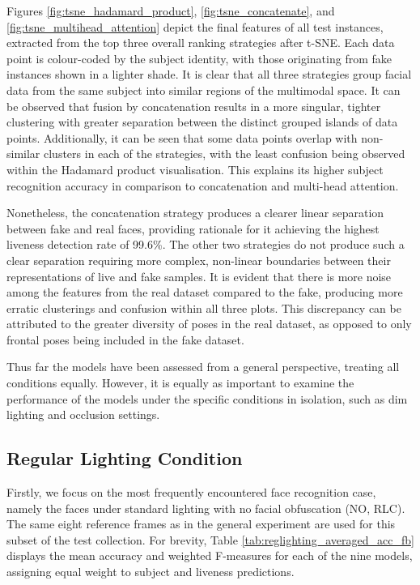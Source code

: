 \documentclass{mpaper}
\begin{document}
Figures \ref{fig:tsne_hadamard_product}, \ref{fig:tsne_concatenate}, and \ref{fig:tsne_multihead_attention} depict the final features of all test instances, extracted from the top three overall ranking strategies after t-SNE. Each data point is colour-coded by the subject identity, with those originating from fake instances shown in a lighter shade. It is clear that all three strategies group facial data from the same subject into similar regions of the multimodal space. It can be observed that fusion by concatenation results in a more singular, tighter clustering with greater separation between the distinct grouped islands of data points. Additionally, it can be seen that some data points overlap with non-similar clusters in each of the strategies, with the least confusion being observed within the Hadamard product visualisation. This explains its higher subject recognition accuracy in comparison to concatenation and multi-head attention. 

Nonetheless, the concatenation strategy produces a clearer linear separation between fake and real faces, providing rationale for it achieving the highest liveness detection rate of 99.6\%. The other two strategies do not produce such a clear separation requiring more complex, non-linear boundaries between their representations of live and fake samples. It is evident that there is more noise among the features from the real dataset compared to the fake, producing more erratic clusterings and confusion within all three plots. This discrepancy can be attributed to the greater diversity of poses in the real dataset, as opposed to only frontal poses being included in the fake dataset. 

Thus far the models have been assessed from a general perspective, treating all conditions equally. However, it is equally as important to examine the performance of the models under the specific conditions in isolation, such as dim lighting and occlusion settings.


\subsection{Regular Lighting Condition}
Firstly, we focus on the most frequently encountered face recognition case, namely the faces under standard lighting with no facial obfuscation (NO, RLC). The same eight reference frames as in the general experiment are used for this subset of the test collection. For brevity, Table \ref{tab:reglighting_averaged_acc_fb} displays the mean accuracy and weighted F-measures for each of the nine models, assigning equal weight to subject and liveness predictions. 
\end{document}
